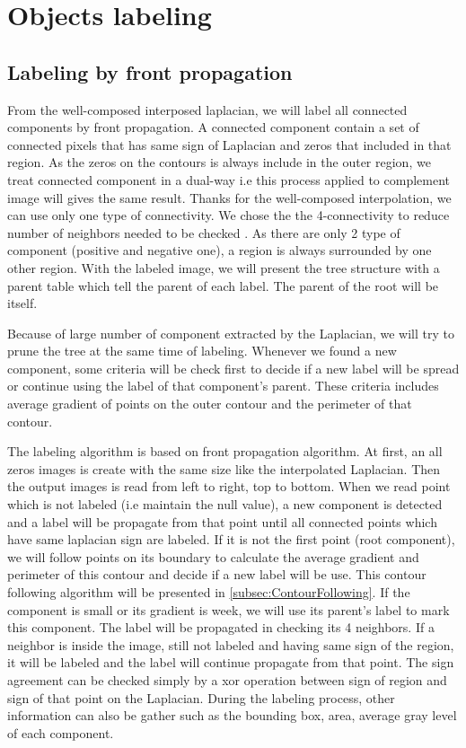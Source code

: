 \section{Objects labeling}

\subsection{Labeling by front propagation}
\par From the well-composed interposed laplacian, we will label all connected components by front propagation. A connected component contain a set of connected pixels that has same sign of Laplacian and zeros that included in that region. As the zeros on the contours is always include in the outer region, we treat connected component in a dual-way i.e this process applied to complement image will gives the same result. Thanks for the well-composed interpolation, we can use only one type of connectivity. We chose the the 4-connectivity to reduce number of neighbors needed to be checked . As there are only 2 type of component (positive and negative one), a region is always surrounded by one other region. With the labeled image, we will present the tree structure with a parent table which tell the parent of each label. The parent of the root will be itself.
\par
Because of large number of component extracted by the Laplacian, we will try to prune the tree at the same time of labeling. Whenever we found a new component, some criteria will be check first to decide if a new label will be spread or continue using the label of that component's parent. These criteria includes average gradient of points on the outer contour and the perimeter of that contour.  
\par
The labeling algorithm is based on front propagation algorithm. At first, an all zeros images is create with the same size like the interpolated Laplacian. Then the output images is read from left to right, top to bottom. When we read point which is not labeled (i.e maintain the null value), a new component is detected and a label will be propagate from that point until all connected points which have same laplacian sign are labeled. If it is not the first point (root component), we will follow points on its boundary to calculate the average gradient and perimeter of this contour and decide if a new label will be use. This contour following algorithm will be presented in \ref{subsec:ContourFollowing}. If the component is small or its gradient is week, we will use its parent's label to mark this component. The label will be propagated in checking its 4 neighbors. If a neighbor is inside the image, still not labeled and having same sign of the region, it will be labeled and the label will continue propagate from that point. The sign agreement can be checked simply by a xor operation between sign of region and sign of that point on the Laplacian. During the labeling process, other information can also be gather such as the bounding box, area, average gray level of each component. 
